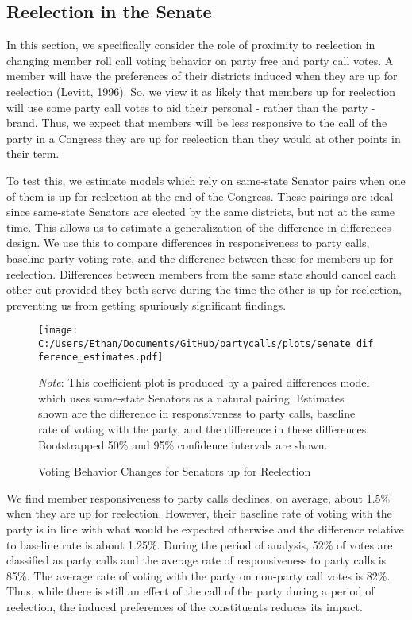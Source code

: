 \documentclass[12pt]{article}
\newcommand\fnote[1]{\captionsetup{font=small}\caption*{#1}}
\begin{document}
\subsection{Reelection in the Senate}

In this section, we specifically consider the role of proximity to reelection in changing member roll call voting behavior on party free and party call votes. A member will have the preferences of their districts induced when they are up for reelection (Levitt, 1996). So, we view it as likely that members up for reelection will use some party call votes to aid their personal - rather than the party - brand. Thus, we expect that members will be less responsive to the call of the party in a Congress they are up for reelection than they would at other points in their term.

To test this, we estimate models which rely on same-state Senator pairs when one of them is up for reelection at the end of the Congress. These pairings are ideal since same-state Senators are elected by the same districts, but not at the same time. This allows us to estimate a generalization of the difference-in-differences design. We use this to compare differences in responsiveness to party calls, baseline party voting rate, and the difference between these for members up for reelection. Differences between members from the same state should cancel each other out provided they both serve during the time the other is up for reelection, preventing us from getting spuriously significant findings.

\begin{figure}[H]
	\centering
	\caption{Voting Behavior Changes for Senators up for Reelection}
	\texttt{[image: C:/Users/Ethan/Documents/GitHub/partycalls/plots/senate\_difference\_estimates.pdf]}
	\fnote{\textit{Note}: This coefficient plot is produced by a paired differences model which uses same-state Senators as a natural pairing. Estimates shown are the difference in responsiveness to party calls, baseline rate of voting with the party, and the difference in these differences. Bootstrapped 50\% and 95\% confidence intervals are shown.}
\end{figure}

We find member responsiveness to party calls declines, on average, about 1.5\% when they are up for reelection. However, their baseline rate of voting with the party is in line with what would be expected otherwise and the difference relative to baseline rate is about 1.25\%. During the period of analysis, 52\% of votes are classified as party calls and the average rate of responsiveness to party calls is 85\%. The average rate of voting with the party on non-party call votes is 82\%. Thus, while there is still an effect of the call of the party during a period of reelection, the induced preferences of the constituents reduces its impact.
\end{document}
